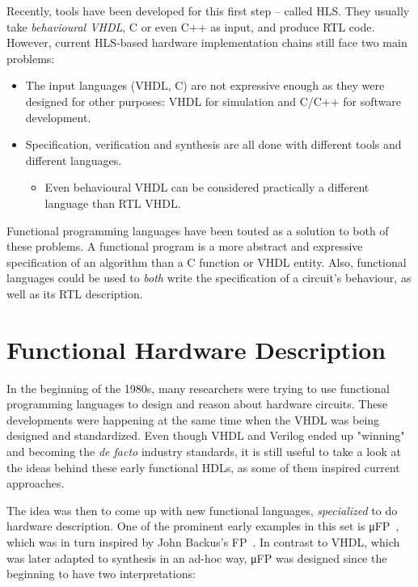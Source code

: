         Recently, tools have been developed for this first step – called \ac{HLS}.
        They usually take \emph{behavioural \acs{VHDL}}, C or even C++ as input, and produce \ac{RTL} code.
        However, current \acs{HLS}-based hardware implementation chains still face two main problems:

        \begin{itemize}
            \item The input languages (VHDL, C) are not expressive enough as they were designed for other purposes:
                \acs{VHDL} for simulation and C/C++ for software development.
            \item Specification, verification and synthesis are all done with different tools and different languages.
            \begin{itemize}
                \item Even behavioural \acs{VHDL} can be considered practically a different language
                    than \acl{RTL} \acs{VHDL}.
            \end{itemize}
        \end{itemize}

        Functional programming languages have been touted as a solution to both of these problems.
        A functional program is a more abstract and expressive specification of an algorithm than
        a C function or VHDL entity.
        Also, functional languages could be used to \emph{both} write the specification of a circuit's behaviour,
        as well as its \acl{RTL} description.


    \section{Functional Hardware Description}
    \label{sec:functional-hardware}
        In the beginning of the 1980s, many researchers were trying to use functional programming languages
        to design and reason about hardware circuits.
        These developments were happening at the same time when the \ac{VHDL} was being designed and standardized.
        Even though \ac{VHDL} and Verilog ended up "winning" and becoming the \emph{de facto} industry standards,
        it is still useful to take a look at the ideas behind these early functional \acp{HDL},
        as some of them inspired current approaches.

        The idea was then to come up with new functional languages, \emph{specialized} to do hardware description.
        One of the prominent early examples in this set is μFP~\cite{mufp-1984},
        which was in turn inspired by John Backus's FP~\cite{backus-turing-lecture}.
        In contrast to \ac{VHDL}, which was later adapted to synthesis in an ad-hoc way,
        μFP was designed since the beginning to have two interpretations:

